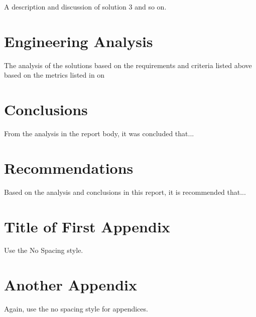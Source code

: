 \documentclass{ece}
\begin{document}
A description and discussion of solution 3 and so on.

\section{Engineering Analysis}

The analysis of the solutions based on the requirements and criteria listed above based on the metrics listed in  on 

\section*{Conclusions}

From the analysis in the report body, it was concluded that...

\section*{Recommendations}

Based on the analysis and conclusions in this report, it is recommended that...


\printglossaries


\printbibliography[heading=none]


\appendix

\section{Title of First Appendix}
\label{app:firstappx}
Use the No Spacing style.

\section{Another Appendix}
\label{app:anotherappx}
Again, use the no spacing style for appendices.
\end{document}
